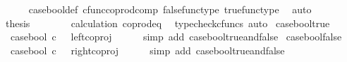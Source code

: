 \begin{isabellebody}
\ \ \ \ \isamarkupfalse%
\ case{\isacharunderscore}{\kern0pt}bool{\isacharunderscore}{\kern0pt}def{}\ cfunc{\isacharunderscore}{\kern0pt}coprod{\isacharunderscore}{\kern0pt}comp\ false{\isacharunderscore}{\kern0pt}func{\isacharunderscore}{\kern0pt}type\ true{\isacharunderscore}{\kern0pt}func{\isacharunderscore}{\kern0pt}type\ \isamarkupfalse%
\ auto\isanewline
\ \ \isamarkupfalse%
\ \isamarkupfalse%
\ {\isacharquery}{\kern0pt}thesis\ \isanewline
\ \ \ \ \isamarkupfalse%
\ \ calculation\ coprod{\isacharunderscore}{\kern0pt}eq{}\ \isamarkupfalse%
\ {\isacharparenleft}{\kern0pt}typecheck{\isacharunderscore}{\kern0pt}cfuncs{\isacharcomma}{\kern0pt}\ auto{\isacharparenright}{\kern0pt}\isanewline
{}\isamarkupfalse%
%
\endisatagproof
{\isafoldproof}%
%
\isadelimproof
\isanewline
%
\endisadelimproof
\isanewline
{}\isamarkupfalse%
\ case{\isacharunderscore}{\kern0pt}bool{\isacharunderscore}{\kern0pt}true{\isacharcolon}{\kern0pt}\isanewline
\ \ {\isachardoublequoteopen}case{\isacharunderscore}{\kern0pt}bool\ {\isasymcirc}\isactrlsub c\ {\isasymt}\ {\isacharequal}{\kern0pt}\ left{\isacharunderscore}{\kern0pt}coproj\ {\isasymone}\ {\isasymone}{\isachardoublequoteclose}\isanewline
%
\isadelimproof
\ \ %
\endisadelimproof
%
\isatagproof
{}\isamarkupfalse%
\ {\isacharparenleft}{\kern0pt}simp\ add{\isacharcolon}{\kern0pt}\ case{\isacharunderscore}{\kern0pt}bool{\isacharunderscore}{\kern0pt}true{\isacharunderscore}{\kern0pt}and{\isacharunderscore}{\kern0pt}false{\isacharparenright}{\kern0pt}%
\endisatagproof
{\isafoldproof}%
%
\isadelimproof
\isanewline
%
\endisadelimproof
\isanewline
{}\isamarkupfalse%
\ case{\isacharunderscore}{\kern0pt}bool{\isacharunderscore}{\kern0pt}false{\isacharcolon}{\kern0pt}\isanewline
\ \ {\isachardoublequoteopen}case{\isacharunderscore}{\kern0pt}bool\ {\isasymcirc}\isactrlsub c\ {\isasymf}\ {\isacharequal}{\kern0pt}\ right{\isacharunderscore}{\kern0pt}coproj\ {\isasymone}\ {\isasymone}{\isachardoublequoteclose}\isanewline
%
\isadelimproof
\ \ %
\endisadelimproof
%
\isatagproof
{}\isamarkupfalse%
\ {\isacharparenleft}{\kern0pt}simp\ add{\isacharcolon}{\kern0pt}\ case{\isacharunderscore}{\kern0pt}bool{\isacharunderscore}{\kern0pt}true{\isacharunderscore}{\kern0pt}and{\isacharunderscore}{\kern0pt}false{\isacharparenright}{\kern0pt}%
\endisatagproof
{\isafoldproof}%
%
\isadelimproof
\isanewline
%
\endisadelimproof
\isanewline
{}\isamarkupfalse%

\end{isabellebody}
